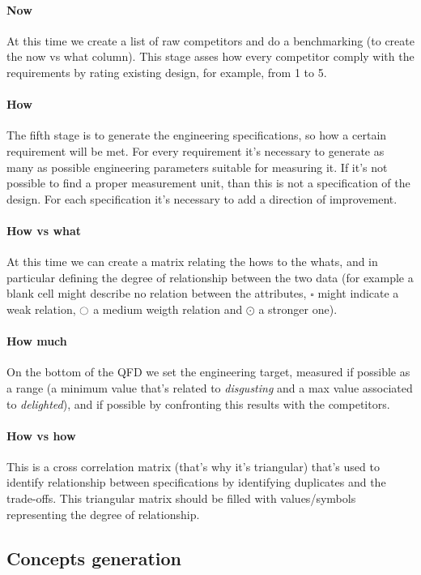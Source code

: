		\paragraph{Now} At this time we create a list of raw competitors and do a benchmarking (to create the now vs what column). This stage asses how every competitor comply with the requirements by rating existing design, for example, from 1 to 5.
		
		\paragraph{How} The fifth stage is to generate the engineering specifications, so how a certain requirement will be met. For every requirement it's necessary to generate as many as possible engineering parameters suitable for measuring it. If it's not possible to find a proper measurement unit, than this is not a specification of the design. For each specification it's necessary to add a direction of improvement.
		
		\paragraph{How vs what} At this time we can create a matrix relating the hows to the whats, and in particular defining the degree of relationship between the two data (for example a blank cell might describe no relation between the attributes, $\square$ might indicate a weak relation, $\ocircle$ a medium weigth relation and $\odot$ a stronger one).
		
		\paragraph{How much} On the bottom of the QFD we set the engineering target, measured if possible as a range (a minimum value that's related to \textit{disgusting} and a max value associated to \textit{delighted}), and if possible by confronting this results with the competitors.
		
		\paragraph{How vs how} This is a cross correlation matrix (that's why it's triangular) that's used to identify relationship between specifications by identifying duplicates and the trade-offs. This triangular matrix should be filled with values/symbols representing the degree of relationship.
		
	\subsection{Concepts generation}
		
	
	
	
